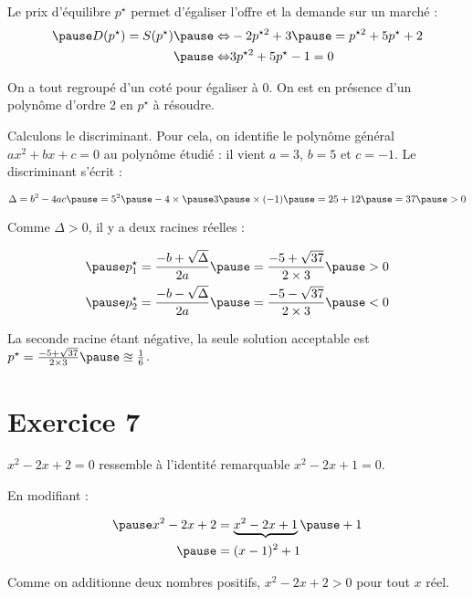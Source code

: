 \documentclass[9pt,professionalfonts,handout,hyperref]{beamer}
\begin{document}
\begin{frame}
	
Le prix d'équilibre $p^{\star}$ permet d'égaliser l'offre et la demande sur un marché : 		
	\[\begin{aligned}
\pause 	D(p^{\star}) = S(p^{\star}) 
\pause 	\Leftrightarrow&-2 p^{\star2}  + 3 \pause = p^{\star2} + 5p^{\star} +2\\
\pause 	\Leftrightarrow& 3 p^{\star2} + 5p^{\star} -1=0\\
	\end{aligned}\]
	
\pause On a tout regroupé d'un coté pour égaliser à 0. \pause On est en présence d'un polynôme d'ordre 2 en $p^{\star}$ à résoudre.\newline  

\pause Calculons le discriminant. \pause Pour cela, on identifie le polynôme général $ax^{2} + bx +c=0$ au polynôme étudié \pause : il vient $a = 3$, $ b=5$ et $c=-1$. \pause Le discriminant s'écrit : 

\[
\Delta = b^2 -4ac \pause = 5^2\pause -4\times \pause 3 \pause \times (-1) \pause = 25+12 \pause = 37 \pause >0
\]

\pause Comme $\Delta>0$, il y a deux racines réelles : 
	
\[\begin{aligned}
\pause &p_1^{\star} = \frac{-b + \sqrt{\Delta}}{2a} \pause = \frac{-5 + \sqrt{37}}{2\times3}\pause >0\\
\pause &p_2^{\star} = \frac{-b - \sqrt{\Delta}}{2a} \pause = \frac{-5 - \sqrt{37}}{2\times3}\pause <0\\
\end{aligned}\]
	
\pause La seconde racine étant négative, la seule solution acceptable est $p^{\star} = \frac{-5 + \sqrt{37}}{2\times3} \pause \approxeq \frac{1}{6}$. 
	
\end{frame}


\section{Exercice 7}

%
%

\begin{frame}
	
$x^2-2x+2 = 0$ ressemble à l'identité remarquable \pause $x^2-2x+1 = 0$.\newline  

En modifiant : 

\[\begin{aligned}
\pause x^2-2x+2 
& = \underbrace{x^2-2x+1} \pause +1 \\
\pause & = (x-1)^2 +1 \\
\end{aligned}\]

Comme on additionne deux nombres positifs, $x^2-2x+2>0$ pour tout $x$ réel. \newline 

\end{frame}
\end{document}

